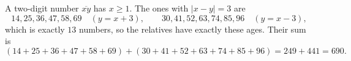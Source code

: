 A two-digit number $\overline{xy}$ has $x\ge1$. The ones with $|x-y|=3$ are
\[
14,25,36,47,58,69\quad(y=x+3),\qquad 30,41,52,63,74,85,96\quad(y=x-3),
\]
which is exactly $13$ numbers, so the relatives have exactly these ages. Their sum is
\[
(14+25+36+47+58+69)+(30+41+52+63+74+85+96)=249+441=\boxed{690}.
\]
